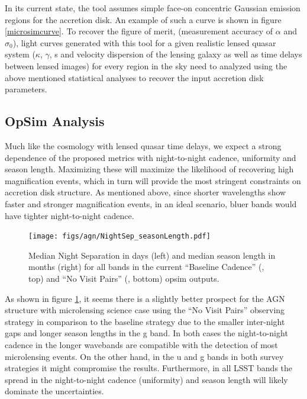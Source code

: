 \noindent In its current state, the tool assumes simple face-on concentric Gaussian emission regions for the accretion disk. An example of such a curve is shown in figure \ref{microsimcurve}. To recover the figure of merit, (measurement accuracy of $\alpha$ and $\sigma_0$), light curves generated with this tool for a given realistic lensed quasar system ($\kappa$, $\gamma$, s and velocity dispersion of the lensing galaxy as well as time delays between lensed images) for every region in the sky need to analyzed using the above mentioned statistical analyses to recover the input accretion disk parameters.




\subsection{OpSim Analysis}
\label{sec:\secname:analysis}

Much like the cosmology with lensed quasar time delays, we expect a strong
dependence of the proposed metrics with night-to-night cadence, uniformity and
season length. Maximizing these will maximize the likelihood of recovering high
magnification events, which in turn will provide the most stringent constraints
on
accretion disk structure. As mentioned above, since shorter wavelengths show
faster and stronger magnification events, in an ideal scenario, bluer bands would have
tighter night-to-night cadence.

\begin{center}
	\begin{figure}[hbt]
		\texttt{[image: figs/agn/NightSep\_seasonLength.pdf]}
		\caption{Median Night Separation in days (left) and median season length in months (right) for all bands in the current ``Baseline Cadence'' (, top) and ``No Visit Pairs''	(, bottom) opsim outputs.}
		\label{microfig}
	\end{figure}
\end{center}

As shown in figure \ref{microfig}, it seems there is a slightly better prospect
for the AGN structure with microlensing science case using the ``No Visit Pairs'' observing
strategy in comparison to the baseline strategy due to the smaller inter-night
gaps and longer season lengths in the g band. In both cases the night-to-night
cadence in the longer wavebands are compatible with the detection of most
microlensing events. On the other hand, in the u and g bands in both survey strategies it might compromise the results. Furthermore, in all LSST bands the spread in the night-to-night cadence (uniformity) and season length will likely dominate the uncertainties.


